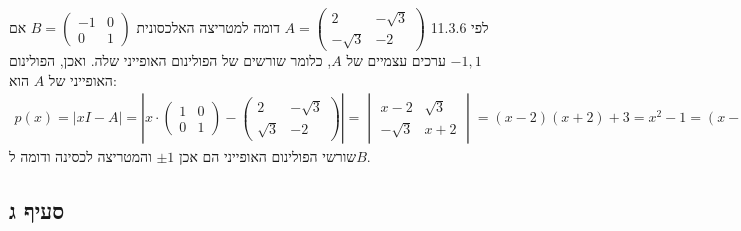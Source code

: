 \documentclass{article}
\begin{document}
לפי 11.3.6 $A=\begin{pmatrix}
        2         & -\sqrt{3} \\
        -\sqrt{3} & -2
    \end{pmatrix}$ דומה למטריצה האלכסונית $B=\begin{pmatrix}
        -1 & 0 \\
        0  & 1
    \end{pmatrix}$ אם $-1,1$ ערכים עצמיים של $A$, כלומר שורשים של הפולינום האופייני שלה. ואכן, הפולינום האופייני של $A$ הוא:
\begin{align*}
    p(x)=|xI-A|=\left|x\cdot\begin{pmatrix}
        1 & 0 \\
        0 & 1
    \end{pmatrix} - \begin{pmatrix}
        2        & -\sqrt{3} \\
        \sqrt{3} & -2
    \end{pmatrix}\right|=
    \begin{vmatrix}
        x-2       & \sqrt{3} \\
        -\sqrt{3} & x+2
    \end{vmatrix}=(x-2)(x+2)+3=x^2-1=(x-1)(x+1)
\end{align*}
שורשי הפולינום האופייני הם אכן $\pm 1$ והמטריצה לכסינה ודומה ל$B$.

\subsection*{סעיף ג}
\end{document}
